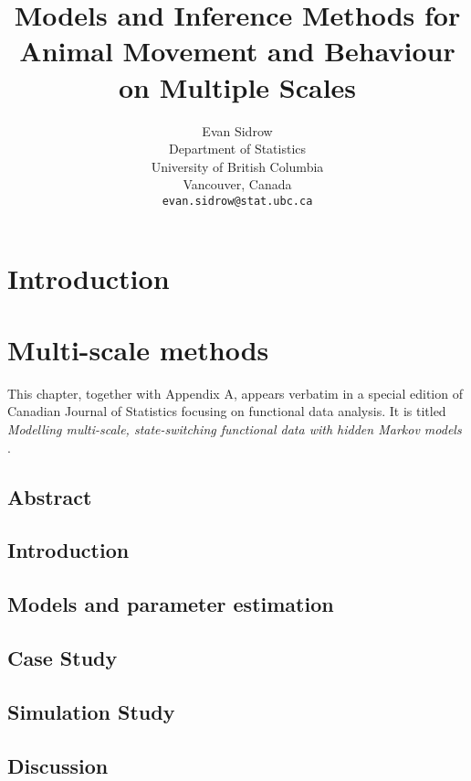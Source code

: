 \documentclass{report}
\title{Models and Inference Methods for Animal Movement and Behaviour on Multiple Scales}
\author{
  Evan Sidrow \\
  Department of Statistics\\
  University of British Columbia\\
  Vancouver, Canada \\
  \texttt{evan.sidrow@stat.ubc.ca} \\
}
\begin{document}
\maketitle

\tableofcontents


\chapter{Introduction}



\chapter{Multi-scale methods}

This chapter, together with Appendix A, appears verbatim in a special edition of Canadian Journal of Statistics focusing on functional data analysis. It is titled \textit{Modelling multi-scale, state-switching functional data with hidden Markov models} \citep{Sidrow:2021}. 

\section{Abstract}
\label{sec:abstr_ms}

%
\section{Introduction}
\label{sec:intro_ms}

%
\section{Models and parameter estimation}
\label{sec:mode_ms}

%
\section{Case Study}
\label{sec:case_ms}

%
\section{Simulation Study}
\label{sec:sim_ms}

%
\section{Discussion}
\label{sec:disc_ms}

\end{document}
